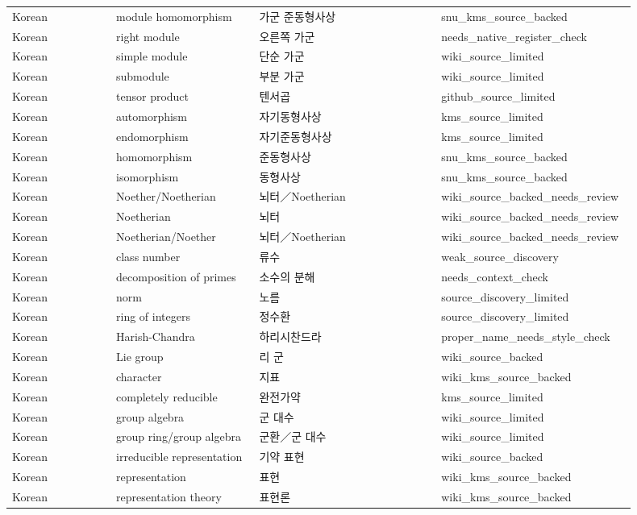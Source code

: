\documentclass{article}
\begin{document}
\begin{longtable}{p{0.16\linewidth}p{0.22\linewidth}p{0.28\linewidth}p{0.24\linewidth}}
Korean & module homomorphism & 가군 준동형사상 & snu\_kms\_source\_backed \\
Korean & right module & 오른쪽 가군 & needs\_native\_register\_check \\
Korean & simple module & 단순 가군 & wiki\_source\_limited \\
Korean & submodule & 부분 가군 & wiki\_source\_limited \\
Korean & tensor product & 텐서곱 & github\_source\_limited \\
Korean & automorphism & 자기동형사상 & kms\_source\_limited \\
Korean & endomorphism & 자기준동형사상 & kms\_source\_limited \\
Korean & homomorphism & 준동형사상 & snu\_kms\_source\_backed \\
Korean & isomorphism & 동형사상 & snu\_kms\_source\_backed \\
Korean & Noether/Noetherian & 뇌터／Noetherian & wiki\_source\_backed\_needs\_review \\
Korean & Noetherian & 뇌터 & wiki\_source\_backed\_needs\_review \\
Korean & Noetherian/Noether & 뇌터／Noetherian & wiki\_source\_backed\_needs\_review \\
Korean & class number & 류수 & weak\_source\_discovery \\
Korean & decomposition of primes & 소수의 분해 & needs\_context\_check \\
Korean & norm & 노름 & source\_discovery\_limited \\
Korean & ring of integers & 정수환 & source\_discovery\_limited \\
Korean & Harish-Chandra & 하리시찬드라 & proper\_name\_needs\_style\_check \\
Korean & Lie group & 리 군 & wiki\_source\_backed \\
Korean & character & 지표 & wiki\_kms\_source\_backed \\
Korean & completely reducible & 완전가약 & kms\_source\_limited \\
Korean & group algebra & 군 대수 & wiki\_source\_limited \\
Korean & group ring/group algebra & 군환／군 대수 & wiki\_source\_limited \\
Korean & irreducible representation & 기약 표현 & wiki\_source\_backed \\
Korean & representation & 표현 & wiki\_kms\_source\_backed \\
Korean & representation theory & 표현론 & wiki\_kms\_source\_backed \\

\end{longtable}
\end{document}
